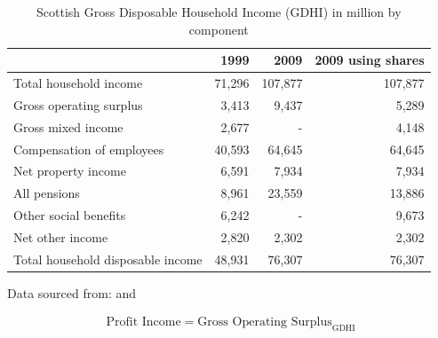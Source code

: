\begin{enumerate}
\bigskip

\begin{table}[H] \caption{Scottish Gross Disposable Household Income (GDHI) in \textsterling million by component}
\bigskip \begin{scriptsize} \begin{centering} \begin{doublespacing}
    \begin{tabular}{lrrr}
        \toprule
          & 1999  & 2009  & 2009 using shares \\
        \hline      
    Total household income &              71,296  &               107,877  &               107,877  \\
    Gross operating surplus &                 3,413  &                   9,437  &                   5,289  \\
    Gross mixed income &                 2,677  &   -    &                   4,148  \\
    Compensation of employees &              40,593  &                 64,645  &                 64,645  \\
    Net property income &                 6,591  &                   7,934  &                   7,934  \\
    All pensions &                 8,961  &                 23,559  &                 13,886  \\
   Other social benefits &                 6,242  &   -    &                   9,673  \\
    Net other income &                 2,820  &                   2,302  &                   2,302  \\
    \hline
    Total household disposable income &              48,931  &                 76,307  &                 76,307  \\
\bottomrule \end{tabular}%
\bigskip \begin{flushright} Data sourced from: \cite{ONS2013a} and \end{flushright} \label{tab:2.4.2} 
\end{doublespacing} \end{centering} \end{scriptsize} \end{table} \bigskip



\begin{equation}
\begin{split}
\text{Profit Income} = \text{Gross Operating Surplus}_\text{GDHI}
\end{split} \label{eq:2.5.3}
\end{equation}


\end{enumerate}
